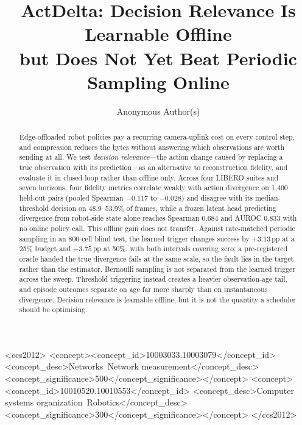 \documentclass[sigconf,10pt,anonymous,review]{acmart}
\newcommand{\pp}{\,pp}
\begin{document}
\title[ActDelta: Decision Relevance Is Learnable Offline]%
      {ActDelta: Decision Relevance Is Learnable Offline\\
       but Does Not Yet Beat Periodic Sampling Online}
\author{Anonymous Author(s)}

\begin{abstract}
Edge-offloaded robot policies pay a recurring camera-uplink cost on every
control step, and compression reduces the bytes without answering which
observations are worth sending at all. We test \emph{decision relevance}---the
action change caused by replacing a true observation with its prediction---as
an alternative to reconstruction fidelity, and evaluate it in closed loop
rather than offline only.
Across four LIBERO suites and seven horizons, four fidelity metrics correlate
weakly with action divergence on 1{,}400 held-out pairs (pooled Spearman
$-0.117$ to $-0.028$) and disagree with its median-threshold decision on
48.9--53.9\% of frames, while a frozen latent head predicting divergence from
robot-side state alone reaches Spearman $0.684$ and AUROC $0.833$ with no
online policy call. This offline gain does not transfer. Against rate-matched
periodic sampling in an 800-cell blind test, the learned trigger changes
success by $+3.13$\pp{} at a 25\% budget and $-3.75$\pp{} at 50\%, with both
intervals covering zero; a pre-registered oracle handed the true divergence
fails at the same scale, so the fault lies in the target rather than the
estimator. Bernoulli sampling is not separated from the learned
trigger across the sweep. Threshold triggering instead creates a heavier
observation-age tail, and episode outcomes separate on age far more sharply
than on instantaneous divergence. Decision relevance is learnable offline, but it is not the quantity a
scheduler should be optimising.
\end{abstract}

\begin{CCSXML}
<ccs2012>
<concept><concept_id>10003033.10003079</concept_id>
<concept_desc>Networks~Network measurement</concept_desc>
<concept_significance>500</concept_significance></concept>
<concept><concept_id>10010520.10010553</concept_id>
<concept_desc>Computer systems organization~Robotics</concept_desc>
<concept_significance>300</concept_significance></concept>
</ccs2012>
\end{CCSXML}
\end{document}
